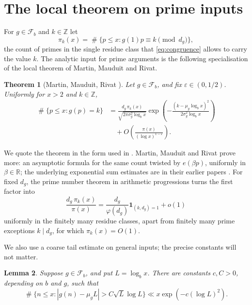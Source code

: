 \documentclass[11pt,reqno]{amsart}
\theoremstyle{plain}
\newtheorem{theorem}{Theorem}[section]
\newtheorem{lemma}[theorem]{Lemma}
\theoremstyle{definition}
\newcommand{\Z}{\mathbb{Z}}
\newcommand{\R}{\mathbb{R}}
\newcommand{\eps}{\varepsilon}
\newcommand{\ee}[1]{e\!\left(#1\right)}
\newcommand{\1}{\mathbf 1}
\DeclareMathOperator{\Card}{\#}
\begin{document}
\section{The local theorem on prime inputs}\label{sec:local}

For $g\in\mathcal F_b$ and $k\in\Z$ let
\[
 \pi_k(x)=\Card\{p\le x:g(1)p\equiv k\pmod{d_g}\},
\]
the count of primes in the single residue class that \eqref{eq:congruence} allows to carry the value $k$. The analytic input for prime arguments is the following specialisation of the local theorem of Martin, Mauduit and Rivat.

\begin{theorem}[Martin, Mauduit, Rivat {\cite[Th\'eor\`eme 1]{mmr2019}}]\label{thm:mmr}
Let $g\in\mathcal F_b$, and fix $\eps\in(0,1/2)$.  Uniformly for $x>2$ and $k\in\Z$,
\begin{equation}\label{eq:mmr}
\begin{split}
 \Card\{p\le x:g(p)=k\}
 &=\frac{d_g\,\pi_k(x)}{\sqrt{2\pi\sigma_g^2\log_bx}}
 \exp\left(-\frac{(k-\mu_g\log_bx)^2}{2\sigma_g^2\log_bx}\right)\\
 &\quad+O\left(\frac{\pi(x)}{(\log x)^{1-\eps}}\right).
\end{split}
\end{equation}
\end{theorem}

We quote the theorem in the form used in \cite{vibefrtz}.  Martin, Mauduit and Rivat prove more: an asymptotic formula for the same count twisted by $\ee{\beta p}$, uniformly in $\beta\in\R$; the underlying exponential sum estimates are in their earlier papers \cite{mmr2014,mmr2015}.  For fixed $d_g$, the prime number theorem in arithmetic progressions turns the first factor into
\begin{equation}\label{eq:localfactor}
 \frac{d_g\,\pi_k(x)}{\pi(x)}
 =\frac{d_g}{\varphi(d_g)}\1_{(k,d_g)=1}+o(1)
\end{equation}
uniformly in the finitely many residue classes, apart from finitely many prime exceptions $k\mid d_g$, for which $\pi_k(x)=O(1)$.

We also use a coarse tail estimate on general inputs; the precise constants will not matter.

\begin{lemma}\label{lem:tail}
Suppose $g\in\mathcal F_b$, and put $L=\log_bx$.  There are constants $c,C>0$, depending on $b$ and $g$, such that
\[
 \Card\{n\le x:|g(n)-\mu_gL|>C\sqrt L\log L\}
 \ll x\exp(-c(\log L)^2).
\]
\end{lemma}
\end{document}
